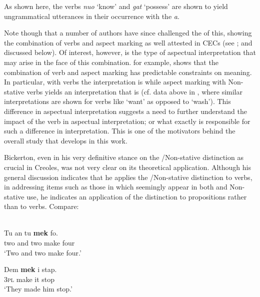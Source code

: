 \z 
\z

As shown here, the  verbs \textit{nuo} `know' and \textit{gat}
`possess' are shown to yield ungrammatical utterances in their
occurrence with the   \textit{a}.

Note though that a number of authors have since challenged the
 of this, showing the combination of 
verbs and  aspect marking as well attested in CECs (see
\citealt{Jaganauth1987}; and \citealt{Sidnell2002} discussed below).  Of
interest, however, is the type of aspectual interpretation that may
arise in the face of this combination.  \citet{Sidnell2002} for
example, shows that the combination of  verb and 
aspect marking has predictable constraints on meaning.  In particular,
with  verbs the interpretation is  while 
aspect marking with Non-stative verbs yields an interpretation that is
 (cf. data above in \citet{Voorhoeve1957}, where similar
interpretations are shown for verbs like `want' as opposed to `wash').
This difference in aspectual interpretation suggests a need to further
understand the impact of the verb in aspectual interpretation; or what
exactly is responsible for such a difference in interpretation. This
is one of the motivators behind the overall study that develops in
this work.

Bickerton, even in his very definitive stance on the
\slash Non-stative distinction as crucial in Creoles, was not very
clear on its theoretical application.  Although his general discussion
indicates that he applies the \slash Non-stative distinction to
verbs, in addressing items such as those in  which
seemingly appear in both  and Non-stative use, he indicates an
application of the distinction to propositions rather than to verbs.
Compare:

\ea%
\label{ex:2:8}
\citet[30]{Bickerton1975}\\
\ea
\gll Tu an tu \textbf{mek} fo.\\
     two and two make four \\
\glt `Two and two make four.'

\ex
\gll Dem \textbf{mek} i stap.\\
     \textsc{3pl} make it stop\\
\glt `They made him stop.'\z \z

